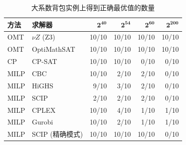 \begin{table}[!htbp]
\centering
\caption{大系数背包实例上得到正确最优值的数量}
\label{tab:exp-exact}
\small
\begin{tabular}{@{}ll rrrr@{}}
\toprule
\textbf{方法} & \textbf{求解器} & $\mathbf{2^{40}}$ & $\mathbf{2^{54}}$ & $\mathbf{2^{60}}$ & $\mathbf{2^{200}}$ \\
\midrule
OMT & $\nu Z$ (Z3) & 10/10 & 10/10 & 10/10 & 10/10 \\
OMT & OptiMathSAT & 10/10 & 10/10 & 10/10 & 10/10 \\
\midrule
CP & CP-SAT & 10/10 & 10/10 & 0/10 & 0/10 \\
\midrule
MILP & CBC & 10/10 & 2/10 & 2/10 & 0/10 \\
MILP & HiGHS & 9/10 & 3/10 & 2/10 & 0/10 \\
MILP & SCIP & 2/10 & 2/10 & 2/10 & 0/10 \\
MILP & CPLEX & 10/10 & 4/10 & 1/10 & 1/10 \\
MILP & Gurobi & 10/10 & 2/10 & 1/10 & 1/10 \\
\midrule
MILP & SCIP (精确模式) & 10/10 & 10/10 & 10/10 & 0/10 \\
\bottomrule
\end{tabular}
\end{table}
